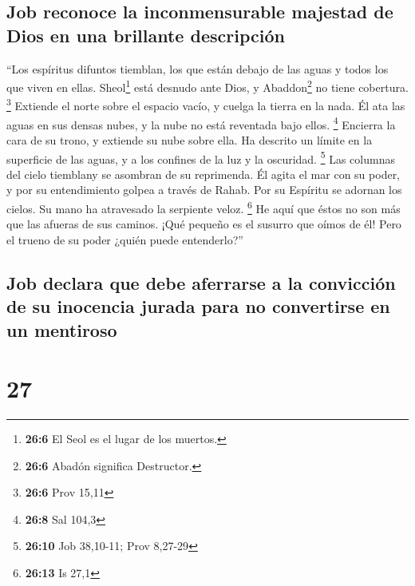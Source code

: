 \hypertarget{job-reconoce-la-inconmensurable-majestad-de-dios-en-una-brillante-descripciuxf3n}{%
\subsection{Job reconoce la inconmensurable majestad de Dios en una
brillante
descripción}\label{job-reconoce-la-inconmensurable-majestad-de-dios-en-una-brillante-descripciuxf3n}}

 ``Los espíritus difuntos tiemblan, los que están debajo
de las aguas y todos los que viven en ellas. 
Sheol\footnote{\textbf{26:6} El Seol es el lugar de los muertos.} está
desnudo ante Dios, y Abaddon\footnote{\textbf{26:6} Abadón significa
  Destructor.} no tiene cobertura. \footnote{\textbf{26:6} Prov 15,11}
 Extiende el norte sobre el espacio vacío, y cuelga la
tierra en la nada.  Él ata las aguas en sus densas nubes,
y la nube no está reventada bajo ellos. \footnote{\textbf{26:8} Sal
  104,3}  Encierra la cara de su trono, y extiende su nube
sobre ella.  Ha descrito un límite en la superficie de
las aguas, y a los confines de la luz y la oscuridad. \footnote{\textbf{26:10}
  Job 38,10-11; Prov 8,27-29}  Las columnas del cielo
tiemblany se asombran de su reprimenda.  Él agita el mar
con su poder, y por su entendimiento golpea a través de Rahab.
 Por su Espíritu se adornan los cielos. Su mano ha
atravesado la serpiente veloz. \footnote{\textbf{26:13} Is 27,1}
 He aquí que éstos no son más que las afueras de sus
caminos. ¡Qué pequeño es el susurro que oímos de él! Pero el trueno de
su poder ¿quién puede entenderlo?''

\hypertarget{job-declara-que-debe-aferrarse-a-la-convicciuxf3n-de-su-inocencia-jurada-para-no-convertirse-en-un-mentiroso}{%
\subsection{Job declara que debe aferrarse a la convicción de su
inocencia jurada para no convertirse en un
mentiroso}\label{job-declara-que-debe-aferrarse-a-la-convicciuxf3n-de-su-inocencia-jurada-para-no-convertirse-en-un-mentiroso}}

\hypertarget{section-26}{%
\section{27}\label{section-26}}

